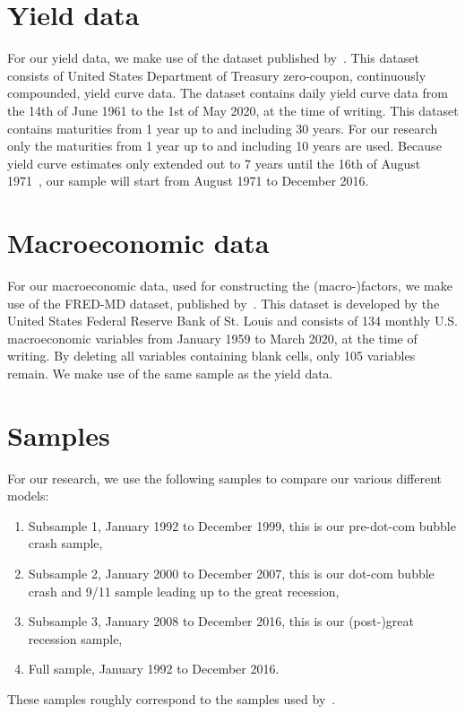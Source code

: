 \section{Yield data}
For our yield data, we make use of the dataset published by~\textcite{gurkaynak_us_2007}. 
This dataset consists of United States Department of Treasury zero-coupon, continuously compounded, yield curve data. 
The dataset contains daily yield curve data from the 14th of June 1961 to the 1st of May 2020, at the time of writing. 
This dataset contains maturities from 1 year up to and including 30 years. 
For our research only the maturities from 1 year up to and including 10 years are used. 
Because yield curve estimates only extended out to 7 years until the 16th of August 1971~\parencite[see][p.~19]{gurkaynak_us_2007}, our sample will start from August 1971 to December 2016. 

\section{Macroeconomic data}
For our macroeconomic data, used for constructing the (macro-)factors, we make use of the FRED-MD dataset, published by~\textcite{mccracken_fred-md_2016}. 
This dataset is developed by the United States Federal Reserve Bank of St. Louis and consists of 134 monthly U.S. macroeconomic variables from January 1959 to March 2020, at the time of writing. 
By deleting all variables containing blank cells, only 105 variables remain. 
We make use of the same sample as the yield data.

\section{Samples}
\label{sec:samples}
For our research, we use the following samples to compare our various different models:
\begin{enumerate}
	\item Subsample 1, January 1992 to December 1999, this is our pre-dot-com bubble crash sample,
	\item Subsample 2, January 2000 to December 2007, this is our dot-com bubble crash and 9/11 sample leading up to the great recession,
	\item Subsample 3, January 2008 to December 2016, this is our (post-)great recession sample,
	\item Full sample, January 1992 to December 2016.
\end{enumerate}
These samples roughly correspond to the samples used by~\textcite{swanson_big_2017}.